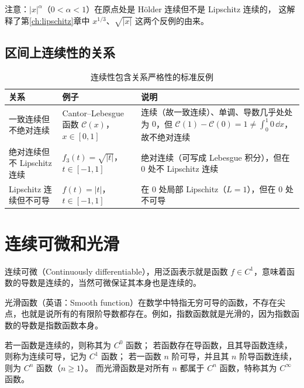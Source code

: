 注意：$|x|^\alpha$（$0<\alpha<1$）在原点处是 Hölder 连续但不是 Lipschitz 连续的，
这解释了第\ref{ch:lipschitz}章中 $x^{1/3}$、$\sqrt{|x|}$ 这两个反例的由来。

\subsection{区间上连续性的关系}\label{subsec:continuity-examples}

\begin{table}[!htb]\centering
  \small
  \begin{tabular}{@{}p{3.0cm}|p{5.0cm}|p{6.2cm}@{}}
    \hline
    关系 & 例子 & 说明 \\
    \hline
    一致连续但不绝对连续 &
    Cantor--Lebesgue 函数 $\mathcal{C}(x)$，$x\in[0,1]$ &
    连续（故一致连续）、单调、导数几乎处处为 $0$，但 $\mathcal{C}(1)-\mathcal{C}(0)=1\neq\int_0^1 0\,\dd x$，故不绝对连续 \\
    \hline
    绝对连续但不 Lipschitz 连续 &
    $f_3(t)=\sqrt{|t|}$，$t\in[-1,1]$ &
    绝对连续（可写成 Lebesgue 积分），但在 $0$ 处不 Lipschitz 连续 \\
    \hline
    Lipschitz 连续但不可导 &
    $f(t)=|t|$，$t\in[-1,1]$ &
    在 $0$ 处局部 Lipschitz（$L=1$），但在 $0$ 处不可导 \\
    \hline
  \end{tabular}
  \caption{连续性包含关系严格性的标准反例}
  \label{tab:continuity-examples}
\end{table}

\section{连续可微和光滑}

连续可微（Continuously differentiable），用泛函表示就是函数 $f\in C^1$，意味着函数的导数是连续的，当然可微保证其本身也是连续的。

光滑函数（英语：Smooth function）在数学中特指无穷可导的函数，不存在尖点，也就是说所有的有限阶导数都存在。例如，指数函数就是光滑的，因为指数函数的导数是指数函数本身。

\begin{definition}[光滑函数]
  若一函数是连续的，则称其为 $C^{0}$ 函数；
  若函数存在导函数，且其导函数连续，则称为连续可导，记为 $C^1$ 函数；
  若一函数 $n$ 阶可导，并且其 $n$ 阶导函数连续，则为 $C^{n}$ 函数（$n\geq 1$）。
  而光滑函数是对所有 $n$ 都属于 $C^{n}$ 函数，特称其为 $C^{\infty}$ 函数。
\end{definition}

